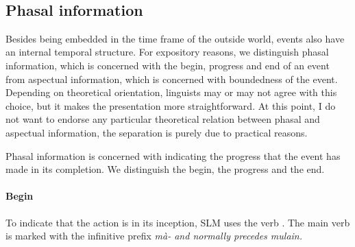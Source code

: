 %

%

 \\

\subsection{Phasal information}\label{sec:func:Phasalinformation}
Besides being embedded in the time frame of the outside world, events also have an internal temporal structure. For expository reasons, we distinguish phasal information, which is concerned with the begin, progress and end of an event from aspectual information, which is concerned with boundedness of the event. Depending on theoretical orientation, linguists may or may not agree with this choice, but it makes the presentation more straightforward. At this point, I do not want to endorse any particular theoretical relation between phasal and aspectual information, the separation is purely due to practical reasons.

Phasal information is concerned with indicating the progress that the event has made in its completion. We distinguish the begin, the progress and the end.

\paragraph{Begin}
To indicate that the action is in its inception, SLM uses the verb . The main verb is marked with the infinitive prefix \em mà- \em and normally precedes \em mulain\em.

 \\
 \\
